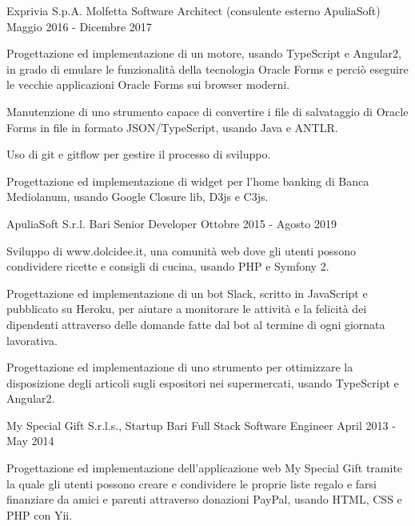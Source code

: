\documentclass{resume} %
\begin{document}

\cvEntry
  {Exprivia S.p.A.}
  {Molfetta}
  {Software Architect (consulente esterno ApuliaSoft)}
  {Maggio 2016 - Dicembre 2017}{
    \begin{cvEntryItems}
      \item Progettazione ed implementazione di un motore, usando TypeScript e Angular2, in
            grado di emulare le funzionalit\`a della tecnologia Oracle Forms e perci\`o
            eseguire le vecchie applicazioni Oracle Forms sui browser moderni.
      \item Manutenzione di uno strumento capace di convertire i file di salvataggio di Oracle
            Forms in file in formato JSON/TypeScript, usando Java e ANTLR.
      \item Uso di git e gitflow per gestire il processo di sviluppo.
      \item Progettazione ed implementazione di widget per l'home banking di Banca Mediolanum,
            usando Google Closure lib, D3js e C3js.
    \end{cvEntryItems}
}


\cvEntry
  {ApuliaSoft S.r.l.}
  {Bari}
  {Senior Developer}
  {Ottobre 2015 - Agosto 2019}{
    \begin{cvEntryItems}
      \item Sviluppo di www.dolcidee.it, una comunit\`a web dove gli utenti possono condividere
            ricette e consigli di cucina, usando PHP e Symfony 2.
      \item Progettazione ed implementazione di un bot Slack, scritto in JavaScript e pubblicato
            su Heroku, per aiutare a monitorare le attivit\`a e la felicit\`a dei dipendenti
            attraverso delle domande fatte dal bot al termine di ogni giornata lavorativa.
      \item Progettazione ed implementazione di uno strumento per ottimizzare la disposizione
            degli articoli sugli espositori nei supermercati, usando TypeScript e Angular2.
    \end{cvEntryItems}
}


\cvEntry
  {My Special Gift S.r.l.s., Startup}
  {Bari}
  {Full Stack Software Engineer}
  {April 2013 - May 2014}{
    \begin{cvEntryItems}
      \item Progettazione ed implementazione dell'applicazione web My Special Gift tramite
            la quale gli utenti possono creare e condividere le proprie liste regalo e farsi
            finanziare da amici e parenti attraverso donazioni PayPal, usando HTML, CSS e
            PHP con Yii.
    \end{cvEntryItems}
}
\end{document}
